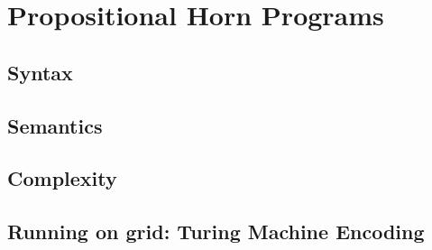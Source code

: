 \documentclass[12pt]{extarticle}
\begin{document}
\cleardoublepage








\section{Propositional Horn Programs}

\subsection{Syntax}

\subsection{Semantics}

\subsection{Complexity}

\subsection{Running on grid: Turing Machine Encoding}
\end{document}
